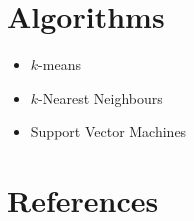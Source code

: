 \documentclass[a4paper,10pt]{article}
\begin{document}
\section{Algorithms}
\begin{itemize}
 \item $k$-means
 \item $k$-Nearest Neighbours
 \item Support Vector Machines
\end{itemize}

\section{References}
\end{document}
